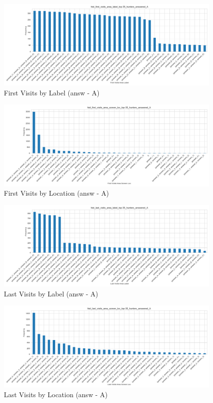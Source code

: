 \documentclass{article}
\begin{document}
\begin{figure}[H]
    \centering
    \includegraphics[width=1\linewidth]{plots/visits_hists/hist_first_visits_area_label_top-35_hunters_answered_A.png}
    \caption{First Visits by Label (answ - A)}
    \label{fig:sl_h}
\end{figure}




\begin{figure}[H]
    \centering
    \includegraphics[width=1\linewidth]{plots/visits_hists/hist_first_visits_area_screen_loc_top-35_hunters_answered_A.png}
    \caption{First Visits by Location (answ - A)}
    \label{fig:sl_h}
\end{figure}


\begin{figure}[H]
    \centering
    \includegraphics[width=1\linewidth]{plots/visits_hists/hist_last_visits_area_label_top-35_hunters_answered_A.png}
    \caption{Last Visits by Label (answ - A)}
    \label{fig:sl_h}
\end{figure}




\begin{figure}[H]
    \centering
    \includegraphics[width=1\linewidth]{plots/visits_hists/hist_last_visits_area_screen_loc_top-35_hunters_answered_A.png}
    \caption{Last Visits by Location (answ - A)}
    \label{fig:sl_h}
\end{figure}
\end{document}
